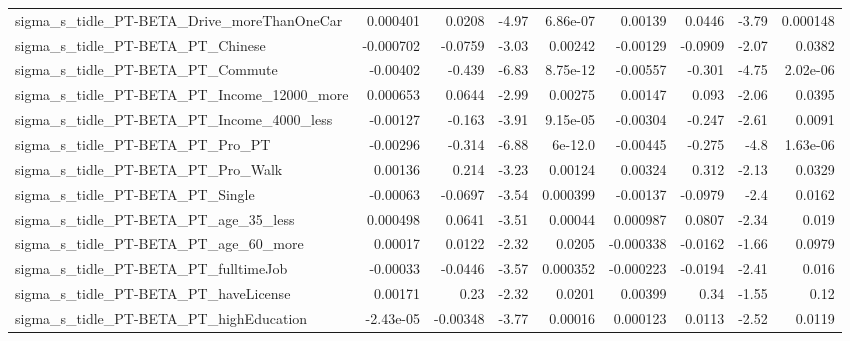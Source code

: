 \begin{tabular}{lrrrrrrrr}
sigma\_s\_tidle\_PT-BETA\_Drive\_moreThanOneCar         &    0.000401 &       0.0208 &     -4.97 & 6.86e-07 &    0.00139 &      0.0446 &        -3.79 &      0.000148 \\
sigma\_s\_tidle\_PT-BETA\_PT\_Chinese                   &   -0.000702 &      -0.0759 &     -3.03 &  0.00242 &   -0.00129 &     -0.0909 &        -2.07 &        0.0382 \\
sigma\_s\_tidle\_PT-BETA\_PT\_Commute                   &    -0.00402 &       -0.439 &     -6.83 & 8.75e-12 &   -0.00557 &      -0.301 &        -4.75 &      2.02e-06 \\
sigma\_s\_tidle\_PT-BETA\_PT\_Income\_12000\_more         &    0.000653 &       0.0644 &     -2.99 &  0.00275 &    0.00147 &       0.093 &        -2.06 &        0.0395 \\
sigma\_s\_tidle\_PT-BETA\_PT\_Income\_4000\_less          &    -0.00127 &       -0.163 &     -3.91 & 9.15e-05 &   -0.00304 &      -0.247 &        -2.61 &        0.0091 \\
sigma\_s\_tidle\_PT-BETA\_PT\_Pro\_PT                    &    -0.00296 &       -0.314 &     -6.88 &  6e-12.0 &   -0.00445 &      -0.275 &         -4.8 &      1.63e-06 \\
sigma\_s\_tidle\_PT-BETA\_PT\_Pro\_Walk                  &     0.00136 &        0.214 &     -3.23 &  0.00124 &    0.00324 &       0.312 &        -2.13 &        0.0329 \\
sigma\_s\_tidle\_PT-BETA\_PT\_Single                    &    -0.00063 &      -0.0697 &     -3.54 & 0.000399 &   -0.00137 &     -0.0979 &         -2.4 &        0.0162 \\
sigma\_s\_tidle\_PT-BETA\_PT\_age\_35\_less               &    0.000498 &       0.0641 &     -3.51 &  0.00044 &   0.000987 &      0.0807 &        -2.34 &         0.019 \\
sigma\_s\_tidle\_PT-BETA\_PT\_age\_60\_more               &     0.00017 &       0.0122 &     -2.32 &   0.0205 &  -0.000338 &     -0.0162 &        -1.66 &        0.0979 \\
sigma\_s\_tidle\_PT-BETA\_PT\_fulltimeJob               &    -0.00033 &      -0.0446 &     -3.57 & 0.000352 &  -0.000223 &     -0.0194 &        -2.41 &         0.016 \\
sigma\_s\_tidle\_PT-BETA\_PT\_haveLicense               &     0.00171 &         0.23 &     -2.32 &   0.0201 &    0.00399 &        0.34 &        -1.55 &          0.12 \\
sigma\_s\_tidle\_PT-BETA\_PT\_highEducation             &   -2.43e-05 &     -0.00348 &     -3.77 &  0.00016 &   0.000123 &      0.0113 &        -2.52 &        0.0119 \\

\end{tabular}
